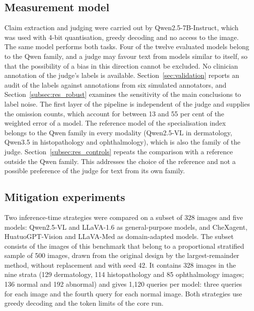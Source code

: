 \documentclass[11pt,a4paper]{article}
\begin{document}
\subsection{Measurement model}\label{sec:measurement}
Claim extraction and judging were carried out by Qwen2.5-7B-Instruct, which was used with 4-bit quantisation, greedy decoding and no access to the image. The same model performs both tasks. Four of the twelve evaluated models belong to the Qwen family, and a judge may favour text from models similar to itself, so that the possibility of a bias in this direction cannot be excluded. No clinician annotation of the judge's labels is available. Section~\ref{sec:validation} reports an audit of the labels against annotations from six simulated annotators, and Section~\ref{subsec:res_robust} examines the sensitivity of the main conclusions to label noise. The first layer of the pipeline is independent of the judge and supplies the omission counts, which account for between 13 and 55 per cent of the weighted error of a model. The reference model of the specialisation index belongs to the Qwen family in every modality (Qwen2.5-VL in dermatology, Qwen3.5 in histopathology and ophthalmology), which is also the family of the judge. Section~\ref{subsec:res_controls} repeats the comparison with a reference outside the Qwen family. This addresses the choice of the reference and not a possible preference of the judge for text from its own family.

\subsection{Mitigation experiments}\label{sec:setup_mitigation}
Two inference-time strategies were compared on a subset of 328 images and five models: Qwen2.5-VL and LLaVA-1.6 as general-purpose models, and CheXagent, HuatuoGPT-Vision and LLaVA-Med as domain-adapted models. The subset consists of the images of this benchmark that belong to a proportional stratified sample of 500 images, drawn from the original design by the largest-remainder method, without replacement and with seed 42. It contains 328 images in the nine strata (129 dermatology, 114 histopathology and 85 ophthalmology images; 136 normal and 192 abnormal) and gives 1{,}120 queries per model: three queries for each image and the fourth query for each normal image. Both strategies use greedy decoding and the token limits of the core run.
\end{document}

